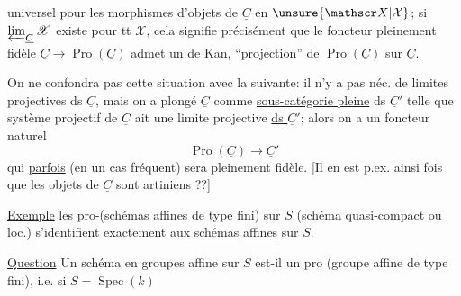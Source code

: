 
universel pour les morphismes d'objets de $\underline C$ en $\unsure{\mathscr X|\mathcal X}$; si $\varprojlim_{\underline C}\mathscr X$ existe pour tt $\mathscr X$, cela signifie précisément que le foncteur  pleinement fidèle $\underline C\longrightarrow\operatorname{Pro}(\underline C)$ admet un  de Kan, ``projection'' de $\operatorname{Pro}(\underline C)$  sur $\underline C$.

On ne confondra pas cette situation avec la suivante:  il n'y a pas néc. de limites projectives ds $\underline C$, mais on a plongé $\underline C$ comme \uline{sous-catégorie pleine} ds $\underline C'$ telle que  système projectif de $\underline C$ ait une limite projective \uline{ds $\underline C'$}; alors on a un foncteur naturel
\[
\operatorname{Pro}(\underline C)\longrightarrow\underline C'
\]
qui \uline{parfois}  (en un cas fréquent) sera pleinement fidèle. [Il en est p.ex. ainsi  fois que les objets de $\underline C$ sont artiniens ??]

\uline{Exemple} les pro-(schémas affines de type fini) sur $S$  (schéma quasi-compact ou  loc.) s'identifient exactement aux \uline{schémas} \uline{affines} sur $S$.

\uline{Question}  Un schéma en groupes affine sur $S$ est-il un pro (groupe affine de type fini), i.e. si $S=\operatorname{Spec}(k)$
